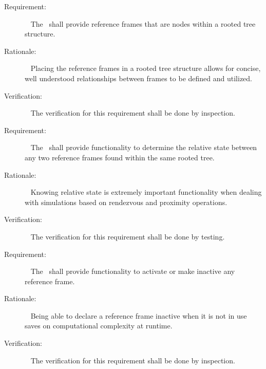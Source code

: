 \label{reqt:refframe_tree_struct}
\begin{description}
\item[Requirement:]\ \newline
The \ shall provide reference frames that are nodes within
a rooted tree structure.
\item[Rationale:]\ \newline
Placing the reference frames in a rooted tree structure allows for concise,
well understood relationships between frames to be defined and utilized.
\item[Verification:]\ \newline
The verification for this requirement shall be done by inspection.
\end{description}

\label{reqt:refframe_rel_state}
\begin{description}
\item[Requirement:]\ \newline
The \ shall provide functionality to determine the relative state
between any two reference frames found within the same rooted tree.
\item[Rationale:]\ \newline
Knowing relative state is extremely important functionality when dealing
with simulations based on rendezvous and proximity operations.
\item[Verification:]\ \newline
The verification for this requirement shall be done by testing.
\end{description}

\label{reqt:refframe_active_inactive}
\begin{description}
\item[Requirement:]\ \newline
The \ shall provide functionality to activate or make inactive
any reference frame.
\item[Rationale:]\ \newline
Being able to declare a reference frame inactive when it is not in use saves
on computational complexity at runtime.
\item[Verification:]\ \newline
The verification for this requirement shall be done by inspection.
\end{description}

